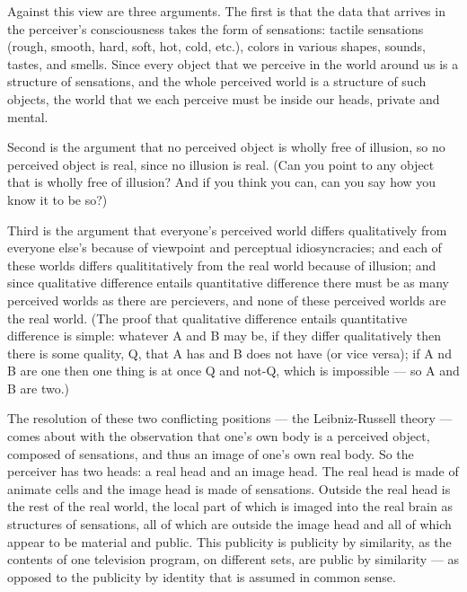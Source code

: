 \documentclass[11pt]{article}
\begin{document}
{{Against this view are three arguments. The first is that the data that arrives in the perceiver's consciousness takes the form of sensations: tactile sensations (rough, smooth, hard, soft, hot, cold, etc.), colors in various shapes, sounds, tastes, and smells. Since every object that we perceive in the world around us is a structure of sensations, and the whole perceived world is a structure of such objects, the world that we each perceive must be inside our heads, private and mental.

Second is the argument that no perceived object is wholly free of illusion, so no perceived object is real, since no illusion is real. (Can you point to any object that is wholly free of illusion? And if you think you can, can you say how you know it to be so?)

Third is the argument that everyone's perceived world differs qualitatively from everyone else's because of viewpoint and perceptual idiosyncracies; and each of these worlds differs qualititatively from the real world because of illusion; and since qualitative difference entails quantitative difference there must be as many perceived worlds as there are percievers, and none of these perceived worlds are the real world. (The proof that qualitative difference entails quantitative difference is simple: whatever A and B may be, if they differ qualitatively then there is some quality, Q, that A has and B does not have (or vice versa); if A nd B are one then one thing is at once Q and not-Q, which is impossible --- so A and B are two.)

The resolution of these two conflicting positions --- the Leibniz-Russell theory --- comes about with the observation that one's own body is a perceived object, composed of sensations, and thus an image of one's own real body. So the perceiver has two heads: a real head and an image head. The real head is made of animate cells and the image head is made of sensations. Outside the real head is the rest of the real world, the local part of which is imaged into the real brain as structures of sensations, all of which are outside the image head and all of which appear to be material and public. This publicity is publicity by similarity, as the contents of one television program, on different sets, are public by similarity --- as opposed to the publicity by identity that is assumed in common sense.

}}
\end{document}
